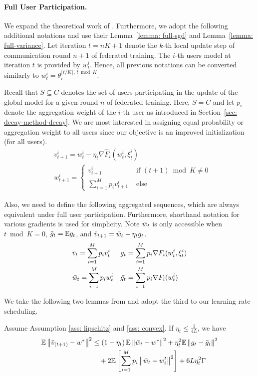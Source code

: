 \paragraph{Full User Participation.}
We expand the theoretical work of \citet{fedavg-conv}.
Furthermore, we adopt the following additional notations and use their Lemma~\ref{lemma: full-sgd} and Lemma~\ref{lemma: full-variance}.
Let iteration $t = nK + 1$ denote the $k$-th local update step of communication round $n + 1$ of federated training.
The $i$-th users model at iteration $t$ is provided by $w_t^i$. 
Hence, all previous notations can be converted similarly to $w_t^i = \theta_i^{\lfloor t / K \rfloor,\, t \bmod K}$.

Recall that $S \subseteq C$ denotes the set of users participating in the update of the global model for a given round $n$ of federated training.
Here, $S = C$ and let $p_i$ denote the aggregation weight of the $i$-th user as introduced in Section~\ref{sec: decay-method-decay}.
We are most interested in assigning equal probability or aggregation weight to all users since our objective is an improved initialization (for all users).
\begin{align*}
    & v_{t + 1}^i = w_t^i - \eta_t \nabla \hat F_i(w_t^i, \xi_t^i) \\
    & w_{t + 1}^i = \begin{cases}
        v_{t + 1}^i & \textrm{ if } (t + 1) \bmod K \neq 0 \\
        \sum_{i = 1}^M p_i v_{t + 1}^i & \textrm{ else }
    \end{cases} 
\end{align*}

Also, we need to define the following aggregated sequences, which are always equivalent under full user participation.
Furthermore, shorthand notation for various gradients is used for simplicity.
Note $\Bar{w}_t$ is only accessible when $t \bmod K = 0$, $\Bar{g}_t = \mathbb{E} g_t$, and $\Bar{v}_{t + 1} = \Bar{w}_t - \eta_t g_t$.
\begin{align*}
    & \Bar{v}_t = \sum_{i = 1}^M p_i v_t^i  && g_t = \sum_{i = 1}^M p_i \nabla F_i(w_t^i, \xi_t^i) \\
    & \Bar{w}_t = \sum_{i = 1}^M p_i w_t^i  && \Bar{g_t} = \sum_{i = 1}^M p_i \nabla F_i(w_t^i)
\end{align*}

We take the following two lemmas from \citet{fedavg-conv} and adopt the third to our learning rate scheduling.
\begin{lemma}
\label{lemma: full-sgd}
    Assume Assumption \ref{ass: lipschitz} and \ref{ass: convex}. If $\eta_t \leq \frac{1}{4L}$, we have
    \begin{align*}
        \mathbb{E} \norm{\Bar{v}_{(t + 1)} - w^*}^2 & \leq \left( 1 - \eta_t \right) \mathbb{E} \norm{\Bar{w}_t - w^*}^2  %
        + \eta_t^2 \mathbb{E} \norm{g_t - \Bar{g}_t}^2 \\
        & \quad + 2 \mathbb{E} \left[ \sum_{i=1}^M p_i \norm{\Bar{w}_t - w_i^t}^2 \right] + 6 L \eta_t^2 \Gamma
    \end{align*}
\end{lemma}


